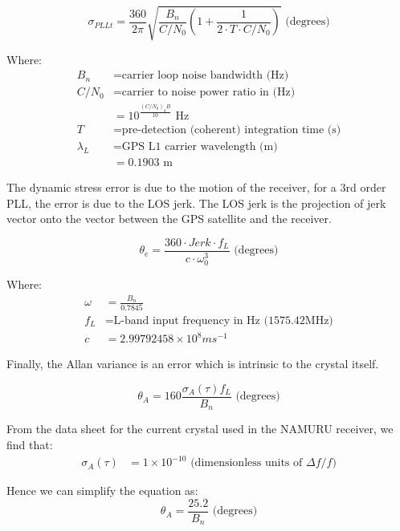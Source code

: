\begin{equation}
\sigma_{PLLt} = \frac{360}{2 \pi} \sqrt{\frac{B_n}{C/N_0}(1+\frac{1}{2 \cdot T \cdot C/N_0})} \text{ (degrees)}
\label{eq:ThermalJitter}
\end{equation}

Where:
\begin{align*}
B_n &= \text{carrier loop noise bandwidth (Hz)} \\
C/N_0 &= \text{carrier to noise power ratio in (Hz)} \\
&=10^\frac{(C/N_0)_dB}{10} \text{ Hz}\\
T &= \text{pre-detection (coherent) integration time (s)} \\
\lambda_L &= \text{GPS L1 carrier wavelength (m)}\\
&= 0.1903 \text{ m}
\end{align*}



The dynamic stress error is due to the motion of the receiver, for a 3rd order PLL, the error is due to the \ac{LOS} jerk. The \ac{LOS} jerk is the projection of jerk vector onto the vector between the \ac{GPS} satellite and the receiver.  

\begin{equation}
\theta_e = \frac{360 \cdot Jerk  \cdot f_L}{c  \cdot \omega^3_0} \text{ (degrees)}
\label{eq:DynamicStressError}
\end{equation}

Where:
\begin{align*}
\omega &= \frac{B_n}{0.7845} \\
f_L &= \text{L-band input frequency in Hz (1575.42MHz)}\\ 
c & = 2.99792458 \times 10^8 ms^{-1}
\end{align*}


Finally, the Allan variance is an error which is intrinsic to the crystal itself. 

\begin{equation}
\theta_{A} = 160 \frac{\sigma_A(\tau)f_L}{B_n} \text{ (degrees)}
\end{equation}

From the data sheet for the current crystal used in the \ac{NAMURU} receiver\cite{VT803Datasheet}, we find that: 
\begin{align*}
\sigma_A(\tau) &= 1 \times 10^{-10} \text{ (dimensionless units of }\Delta f/f\text{)}
\end{align*}

Hence we can simplify the equation as:
\begin{equation}
\theta_{A} =\frac{25.2}{B_n} \text{ (degrees)}
\label{eq:AllanVariance}
\end{equation}

